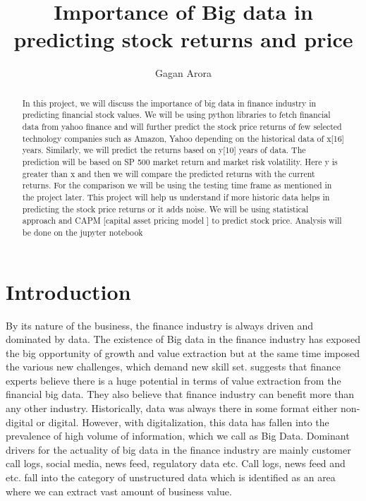 \title{Importance of Big data in predicting stock returns and price}


\author{Gagan Arora}
\orcid{}




\renewcommand{\shortauthors}{Gagan Arora}


\begin{abstract}
In this project, we will discuss the importance of big data in finance industry in predicting financial stock values.  
We will be using python libraries to fetch financial data from yahoo finance and will further predict the stock price returns of few selected technology
companies such as Amazon, Yahoo depending on the historical data of x[16] years. Similarly, we will predict the returns based on y[10] years of data. 
The prediction will be based on SP 500 market return and market risk volatility. 
Here y is greater than x and then we will compare the predicted returns with the current returns. For the comparison we will be using the testing time frame as mentioned
in the project later. This project will help us understand if more historic data helps in predicting the stock price returns or it adds noise. 
We will be using statistical approach and CAPM [capital asset pricing model ] to predict stock price.  Analysis will be done on the jupyter notebook
\end{abstract}



\maketitle

\section{Introduction}
By its nature of the business, the finance industry is always driven and dominated by data. 
The existence of Big data in the finance industry has exposed the big opportunity of growth and value extraction but at the 
same time imposed the various new challenges, which demand new skill set. \cite{Ref1} suggests that finance experts believe there 
is a huge potential in terms of value extraction from the financial big data.
They also believe that finance industry can benefit more than any other industry.  Historically, data was always there in some format either 
non-digital or digital. However, with digitalization, this data has fallen into the prevalence of high volume of information, which we call as Big Data.
Dominant drivers for the actuality of big data in the finance industry are mainly customer call logs, social media, news feed, regulatory data etc. 
Call logs, news feed and etc. fall into the category of unstructured data which is identified as an area where we can extract vast amount of business value.


